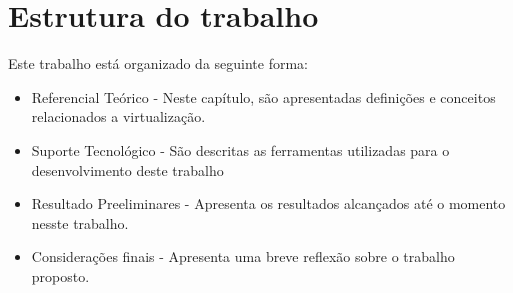 \section{Estrutura do trabalho}

Este trabalho está organizado da seguinte forma:
\begin{itemize}
\item Referencial Teórico - Neste capítulo, são apresentadas definições e conceitos relacionados a virtualização.
\item Suporte Tecnológico - São descritas as ferramentas utilizadas para o desenvolvimento deste trabalho 
\item Resultado Preeliminares - Apresenta os resultados alcançados até o momento nesste trabalho.
\item Considerações finais - Apresenta uma breve reflexão sobre o trabalho proposto.

\end{itemize}

